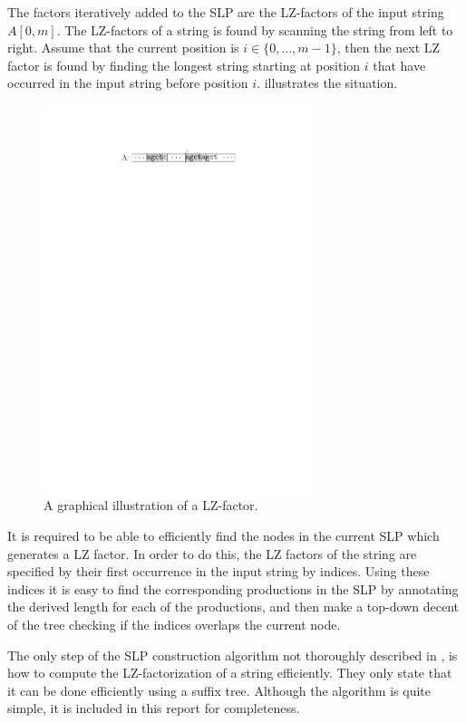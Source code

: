 \documentclass[twoside,11pt,openright]{report}
\newcommand{\str}[3]{#1[#2, #3]}
\begin{document}
The factors iteratively added to the SLP are the LZ-factors of the input string $\str{A}{0}{m}$. The LZ-factors of a string is found by scanning the string from left to right. Assume that the current position is $i \in \{0, \dots, m - 1\}$, then the next LZ factor is found by finding the longest string starting at position $i$ that have occurred in the input string before position $i$.  illustrates the situation.

\begin{figure}[htb]
  \centering
  \includegraphics[width=8cm]{images/lz-factor}
  \caption{A graphical illustration of a LZ-factor.}
  \label{fig:lz-factor}
\end{figure}

It is required to be able to efficiently find the nodes in the current SLP which generates a LZ factor. In order to do this, the LZ factors of the string are specified by their first occurrence in the input string by indices. Using these indices it is easy to find the corresponding productions in the SLP by annotating the derived length for each of the productions, and then make a top-down decent of the tree checking if the indices overlaps the current node.

The only step of the SLP construction algorithm not thoroughly described in \cite{Rytter2003211}, is how to compute the LZ-factorization of a string efficiently. They only state that it can be done efficiently using a suffix tree. Although the algorithm is quite simple, it is included in this report for completeness.
\end{document}
